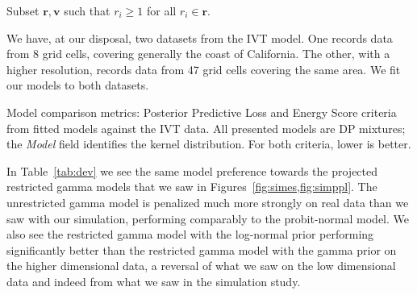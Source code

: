 \begin{algorithm}
  \label{algo:processing}
  Subset $\bm{ r},\bm{ v}$ such that $r_i \geq 1$ for all $r_i\in \bm{r}$.\\
\end{algorithm}

We have, at our disposal, two datasets from the IVT model.  One records data from 8 grid cells, covering
  generally the coast of California.  The other, with a higher resolution, records data from 47 grid
  cells covering the same area.  We fit our models to both datasets.

\begin{table}[h]
  \label{tab:dev}
  
  \caption{Model comparison metrics: Posterior Predictive Loss and Energy Score criteria from fitted
    models against the IVT data.  All presented models are DP mixtures; the \emph{Model} field
    identifies the kernel distribution.  For both criteria, lower is better.}
\end{table}

In Table~\ref{tab:dev} we see the same model preference towards the projected restricted gamma models
  that we saw in Figures~\ref{fig:simes,fig:simppl}.  The unrestricted gamma model is penalized much
  more strongly on real data than we saw with our simulation, performing comparably to the probit-normal
  model.  We also see the restricted gamma model with the log-normal prior performing significantly
  better than the restricted gamma model with the gamma prior on the higher dimensional data, a reversal
  of what we saw on the low dimensional data and indeed from what we saw in the simulation study.


